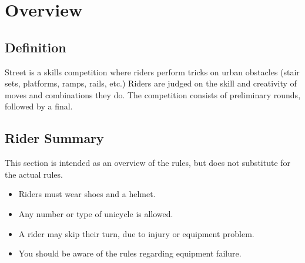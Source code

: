 \chapter{Overview}

\section{Definition}

Street is a skills competition where riders perform 
tricks on urban obstacles (stair sets, platforms, ramps, rails, etc.)
Riders are judged on the skill and creativity of moves and combinations they do.
The competition consists of preliminary rounds, followed by a final.

\section{Rider Summary}

This section is intended as an overview of the rules, but does not substitute for the actual rules.
\begin{itemize}
\item Riders must wear shoes and a helmet.
\item Any number or type of unicycle is allowed.
\item A rider may skip their turn, due to injury or equipment problem.
\item You should be aware of the rules regarding equipment failure.
\end{itemize}